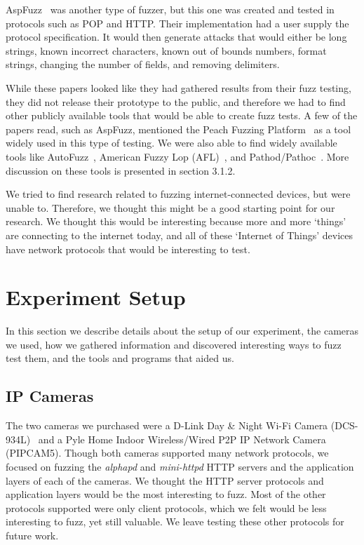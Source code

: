 \documentclass[letterpaper,twocolumn,10pt]{article}
\begin{document}
AspFuzz~\cite{aspfuzz} was another type of fuzzer, but this one was created and tested in protocols such as POP and HTTP. Their implementation had a user supply the protocol specification. It would then generate attacks that would either be long strings, known incorrect characters, known out of bounds numbers, format strings, changing the number of fields, and removing delimiters. 

While these papers looked like they had gathered results from their fuzz testing, they did not release their prototype to the public, and therefore we had to find other publicly available tools that would be able to create fuzz tests. A few of the papers read, such as AspFuzz, mentioned the Peach Fuzzing Platform~\cite{peach} as a tool widely used in this type of testing. We were also able to find widely available tools like AutoFuzz~\cite{autofuzz}, American Fuzzy Lop (AFL)~\cite{afl}, and Pathod/Pathoc~\cite{pathod}. More discussion on these tools is presented in section 3.1.2.

We tried to find research related to fuzzing internet-connected devices, but were unable to. Therefore, we thought this might be a good starting point for our research. We thought this would be interesting because more and more `things' are connecting to the internet today, and all of these `Internet of Things' devices have network protocols that would be interesting to test. 

\section{Experiment Setup}
In this section we describe details about the setup of our experiment, the
cameras we used, how we gathered information and discovered interesting ways to fuzz test them, and the tools and programs that aided us.  

\subsection{IP Cameras}
The two cameras we purchased were a D-Link Day \& Night Wi-Fi Camera (DCS-934L)~\cite{dlinkCam} and a Pyle Home Indoor Wireless/Wired P2P IP Network Camera (PIPCAM5). Though both cameras supported many network protocols, we focused on fuzzing the \textit{alphapd} and \textit{mini-httpd} HTTP servers and the application layers of each of the cameras. We thought the HTTP server protocols and application layers would be the most interesting to fuzz. Most of the other protocols supported were only client protocols, which we felt would be less interesting to fuzz, yet still valuable. We leave testing these other protocols for future work. 
\end{document}
